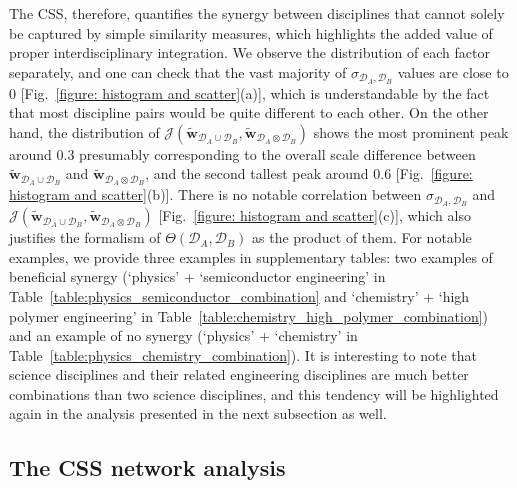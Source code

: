 \documentclass{bmcart}
\begin{document}
The CSS, therefore, quantifies the synergy between disciplines that cannot solely be captured by simple similarity measures, which highlights the added value of proper interdisciplinary integration. 
We observe the distribution of each factor separately, and one can check that the vast majority of $\sigma_{\mathcal{D}_A,\mathcal{D}_B}$ values are close to $0$ [Fig.~\ref{figure: histogram and scatter}(a)], which is understandable by the fact that most discipline pairs would be quite different to each other. 
On the other hand, the distribution of $\mathcal{J}\left(\tilde{\mathbf{w}}_{\mathcal{D}_A \cup \mathcal{D}_B},\tilde{\mathbf{w}}_{\mathcal{D}_A \otimes \mathcal{D}_B} \right)$ shows the most prominent peak around $0.3$ presumably corresponding to the overall scale difference between $\tilde{\mathbf{w}}_{\mathcal{D}_A \cup \mathcal{D}_B}$ and $\tilde{\mathbf{w}}_{\mathcal{D}_A \otimes \mathcal{D}_B}$, and the second tallest peak around $0.6$ [Fig.~\ref{figure: histogram and scatter}(b)]. There is no notable correlation between $\sigma_{\mathcal{D}_A,\mathcal{D}_B}$ and $\mathcal{J}\left(\tilde{\mathbf{w}}_{\mathcal{D}_A \cup \mathcal{D}_B},\tilde{\mathbf{w}}_{\mathcal{D}_A \otimes \mathcal{D}_B} \right)$ [Fig.~\ref{figure: histogram and scatter}(c)], which also justifies the formalism of $\Theta \left( \mathcal{D}_A,\mathcal{D}_B \right)$ as the product of them.
For notable examples, we provide three examples in supplementary tables: two examples of beneficial synergy (`physics' + `semiconductor engineering' in Table~\ref{table:physics_semiconductor_combination} and `chemistry' + `high polymer engineering' in Table~\ref{table:chemistry_high_polymer_combination}) and an example of no synergy (`physics' + `chemistry' in Table~\ref{table:physics_chemistry_combination}). It is interesting to note that science disciplines and their related engineering disciplines are much better combinations than two science disciplines, and this tendency will be highlighted again in the analysis presented in the next subsection as well.

\subsection{The CSS network analysis}
\label{sec:CCS_network}
\end{document}
